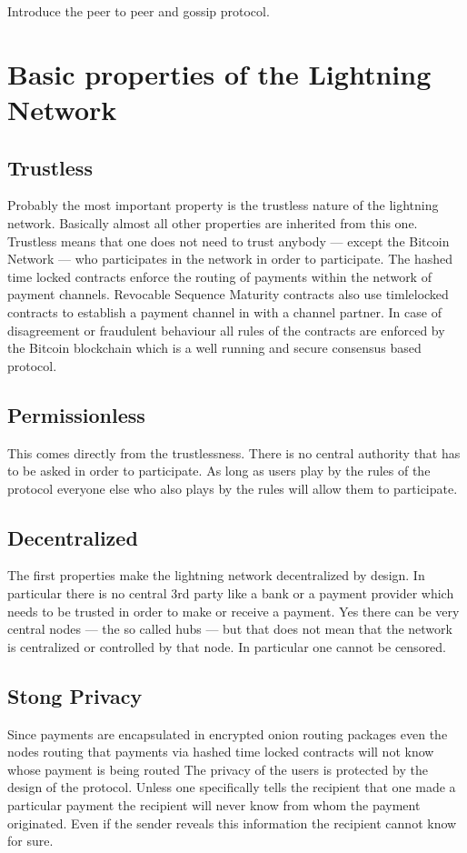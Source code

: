 \documentclass[a4paper,12pt,oneside,openany]{book}
\begin{document}
Introduce the peer to peer and gossip protocol.

\section{Basic properties of the Lightning Network}
\subsection{Trustless}
Probably the most important property is the trustless nature of the lightning network. Basically almost all other properties are inherited from this one. 
Trustless means that one does not need to trust anybody --- except the Bitcoin Network --- who participates in the network in order to participate. 
The hashed time locked contracts enforce the routing of payments within the network of payment channels.
Revocable Sequence Maturity contracts also use timlelocked contracts to establish a payment channel in with a channel partner.
In case of disagreement or fraudulent behaviour all rules of the contracts are enforced by the Bitcoin blockchain which is a well running and secure consensus based protocol. 

\subsection{Permissionless}
This comes directly from the trustlessness.
There is no central authority that has to be asked in order to participate.
As long as users play by the rules of the protocol everyone else who also plays by the rules will allow them to participate.

\subsection{Decentralized}
The first properties make the lightning network decentralized by design.
In particular there is no central 3rd party like a bank or a payment provider which needs to be trusted in order to make or receive a payment.
Yes there can be very central nodes --- the so called hubs --- but that does not mean that the network is centralized or controlled by that node.
In particular one cannot be censored. 

\subsection{Stong Privacy}
Since payments are encapsulated in encrypted onion routing packages even the nodes routing that payments via hashed time locked contracts will not know whose payment is being routed
The privacy of the users is protected by the design of the protocol.
Unless one specifically tells the recipient that one made a particular payment the recipient will never know from whom the payment originated.
Even if the sender reveals this information the recipient cannot know for sure.
\end{document}
